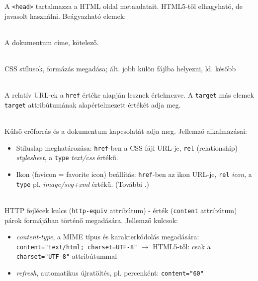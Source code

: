 \begin{frame}
  A \texttt{<head>} tartalmazza a HTML oldal metaadatait. HTML5-től elhagyható, de javasolt használni. Beágyazható elemek:
  \begin{description}[m]
    \item[\texttt{<title>}] \hfill \\ A dokumentum címe, kötelező.
    \item[\texttt{<style>}] \hfill \\ CSS stílusok, formázás megadása; ált. jobb külön fájlba helyezni, ld. később 
    \item[\texttt{<base>}] \hfill \\ A relatív URL-ek a \texttt{href} értéke alapján lesznek értelmezve. A \texttt{target} más elemek \texttt{target} attribútumának alapértelmezett értékét adja meg.
  \end{description}
\end{frame}

\begin{frame}
  \begin{description}[m]
    \item[\texttt{<link>}] \hfill \\ Külső erőforrás és a dokumentum kapcsolatát adja meg. Jellemző alkalmazásai:
    \begin{itemize}
      \item Stíluslap meghatározása: \texttt{href}-ben a CSS fájl URL-je, \texttt{rel} (relationship) \emph{stylesheet}, a \texttt{type} \emph{text/css} értékű.
      \item Ikon (favicon = favorite icon) beállítás: \texttt{href}-ben az ikon URL-je, \texttt{rel} \emph{icon}, a \texttt{type} pl. \emph{image/svg+xml} értékű. (További .)
    \end{itemize}
    \item[\texttt{<meta>}] \hfill \\ HTTP fejlécek kulcs (\texttt{http-equiv} attribútum) - érték (\texttt{content} attribútum) párok formájában történő megadására. Jellemző kulcsok:
    \begin{itemize}
      \item \emph{content-type}, a MIME típus és karakterkódolás megadására: \texttt{content="text/html; charset=UTF-8"} $\to$ HTML5-től: csak a \texttt{charset="UTF-8"} attribútummal
      \item \emph{refresh}, automatikus újratöltés, pl. percenként: \texttt{content="60"}
    \end{itemize}
  \end{description}
\end{frame}

